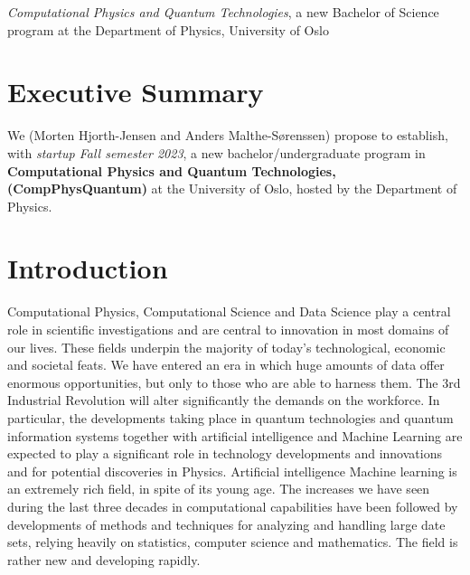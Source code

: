 \documentclass[oneside,final,10pt]{article}
\begin{document}
\thispagestyle{empty}

\begin{center}
{\LARGE\bf
\begin{spacing}{1.25}
{\em Computational Physics and Quantum Technologies}, a new Bachelor of Science program  at the Department of Physics, University of Oslo
\end{spacing}
}
\end{center}



\vspace{1cm}


\section*{Executive Summary}

We (Morten Hjorth-Jensen and Anders Malthe-Sørenssen) propose to establish, with {\em startup Fall semester 2023}, a new bachelor/undergraduate program in {\bf Computational Physics and Quantum Technologies, (CompPhysQuantum)}  at the University of Oslo, hosted by the Department of Physics. 

\section{Introduction}

Computational Physics, Computational Science  and Data Science play a central role in scientific investigations and are central to innovation in most domains of our lives. These fields underpin the majority of today's technological, economic and societal feats. We have entered an era in which huge amounts of data offer enormous opportunities, but only to those who are able to harness them. The 3rd Industrial Revolution will alter significantly the demands on the workforce. In particular, the developments taking place in quantum technologies and quantum information systems together with artificial intelligence and Machine Learning are expected to play a significant role in technology developments and innovations and for potential discoveries in Physics.
Artificial intelligence 
Machine learning  is an extremely rich field, in spite of its young age. The
increases we have seen during the last three decades in computational
capabilities have been followed by developments of methods and
techniques for analyzing and handling large date sets, relying heavily
on statistics, computer science and mathematics.  The field is rather
new and developing rapidly. 
\end{document}

